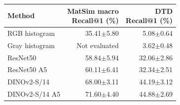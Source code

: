 \begin{tabularx}{\linewidth}{@{}Xrr@{}}
\toprule
Method & \makecell{MatSim macro\\Recall@1 (\%)} & \makecell{DTD\\Recall@1 (\%)} \\
\midrule
RGB histogram & 35.41$\pm$5.80 & 5.08$\pm$0.64 \\
Gray histogram & Not evaluated & 3.62$\pm$0.48 \\
ResNet50 & 58.84$\pm$5.94 & 32.06$\pm$2.86 \\
ResNet50 A5 & 60.11$\pm$6.41 & 32.34$\pm$2.51 \\
DINOv2-S/14 & 68.00$\pm$3.11 & 44.19$\pm$3.12 \\
DINOv2-S/14 A5 & 71.60$\pm$4.40 & 44.88$\pm$2.69 \\
\bottomrule
\end{tabularx}
